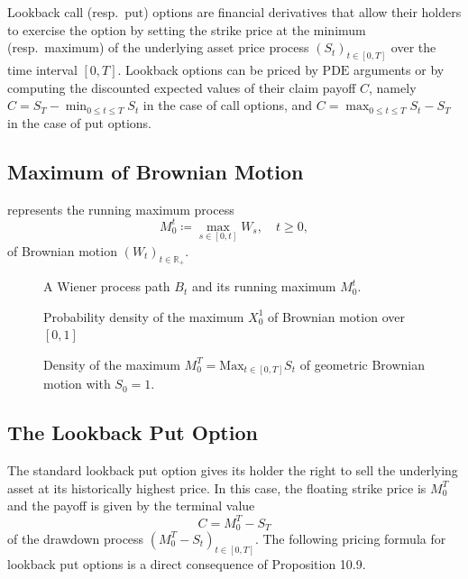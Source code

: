 Lookback call (resp.\ $\mathrm{put}$) options are financial derivatives that allow their holders to exercise the option by setting the strike price at the minimum (resp.\ maximum) of the underlying asset price process $(S_t)_{t \in [0,T]}$ over the time interval $[0,T]$. Lookback options can be priced by $\mathrm{PDE}$ arguments or by computing the discounted expected values of their claim payoff $C$, namely $C = S_T - \min_{0 \le t \le T} S_t$ in the case of call options, and $C = \max_{0 \le t \le T} S_t - S_T$ in the case of put options.

\subsection{Maximum of Brownian Motion}
 represents the running maximum process
\begin{equation}
	M_0^t \coloneqq \max_{s \in [0,t]} W_s, \quad t \geq 0, \nonumber
\end{equation}
of Brownian motion $(W_t)_{t\in\mathbb{R}_{+}}$.
\begin{figure}[H]
	\centering
	
	\caption{A Wiener process path $B_t$ and its running maximum $M_0^t$.}
	\label{fig:runningMax}
\end{figure}

\begin{figure}[H]
	\centering
	
	\caption{Probability density of the maximum $X_0^1$ of Brownian motion over $[0,1]$}
	\label{fig:brownianMaxDensity}
\end{figure}

\begin{figure}[H]
	\centering
	
	\caption{Density of the maximum $M_0^T = \mathrm{Max}_{t\in[0,T]} S_t$ of geometric Brownian motion with $S_0 = 1$.}
	\label{fig:lognormalMaximumDensity}
\end{figure}



\subsection{The Lookback Put Option}
The standard lookback put option gives its holder the right to sell the underlying asset at its historically highest price. In this case, the floating strike price is $M_0^T$ and the payoff is given by the terminal value
\begin{equation}
	C = M_0^T - S_T
\end{equation}
of the drawdown process $(M_0^T - S_t)_{t\in[0,T]}$. The following pricing formula for lookback put options is a direct consequence of Proposition 10.9.

